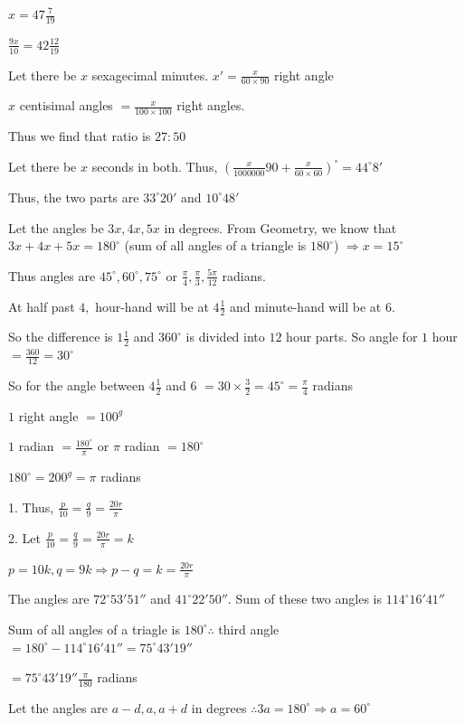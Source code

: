     $x = 47\frac{7}{19}$

    $\frac{9x}{10} = 42\frac{12}{19}$
\item Let there be $x$ sexagecimal minutes. $x' = \frac{x}{60\times 90}$ right angle

    $x$ centisimal angles $= \frac{x}{100\times100}$ right angles.

    Thus we find that ratio is $27:50$
\item Let there be $x$ seconds in both. Thus, $\left(\frac{x}{1000000}90 + \frac{x}{60\times60}\right)^\circ =
    44^\circ8'$

    Thus, the two parts are $33^\circ20'$ and $10^\circ48'$
\item Let the angles be $3x, 4x, 5x$ in degrees. From Geometry, we know that $3x + 4x + 5x = 180^\circ$ (sum of all
    angles of a triangle is $180^\circ$) $\Rightarrow x = 15^\circ$

    Thus angles are $45^\circ, 60^\circ, 75^\circ$ or $\frac{\pi}{4}, \frac{\pi}{3}, \frac{5\pi}{12}$ radians.
\item At half past $4,$ hour-hand will be at $4\frac{1}{2}$ and minute-hand will be at $6.$

    So the difference is $1\frac{1}{2}$ and $360^\circ$ is divided into $12$ hour parts. So angle for $1$
    hour $= \frac{360}{12} = 30^\circ$

    So for the angle between $4\frac{1}{2}$ and $6$ $= 30\times \frac{3}{2} = 45^\circ = \frac{\pi}{4}$ radians
\item $1$ right angle $= 100^g$

    $1$ radian $= \frac{180^\circ}{\pi}$ or $\pi$ radian $= 180^\circ$

    $180^\circ = 200^g = \pi$ radians

    1. Thus, $\frac{p}{10} = \frac{q}{9} = \frac{20r}{\pi}$

    2. Let $\frac{p}{10} = \frac{q}{9} = \frac{20r}{\pi} = k$

       $p = 10k, q = 9k \Rightarrow p - q = k = \frac{20r}{\pi}$
\item The angles are $72^{\circ}53'51''$ and $41^\circ22'50''.$ Sum of these two angles is $114^\circ16'41''$

    Sum of all angles of a triagle is $180^\circ \therefore$ third angle $= 180^\circ - 114^\circ16'41'' =
    75^\circ43'19''$

    $= 75^\circ43'19'' \frac{\pi}{180}$ radians
\item Let the angles are $a - d, a, a + d$ in degrees $\therefore 3a = 180^\circ \Rightarrow a = 60^\circ$

